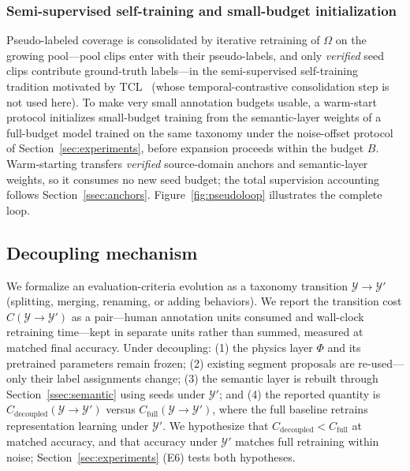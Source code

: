 \subsubsection{Semi-supervised self-training and small-budget initialization}\label{ssec:selftrain}

Pseudo-labeled coverage is consolidated by iterative retraining of $\Omega$ on the growing pool---pool clips enter with their pseudo-labels, and only \emph{verified} seed clips contribute ground-truth labels---in the semi-supervised self-training tradition motivated by TCL~\citep{singh2021tcl} (whose temporal-contrastive consolidation step is not used here). To make very small annotation budgets usable, a warm-start protocol initializes small-budget training from the semantic-layer weights of a full-budget model trained on the same taxonomy under the noise-offset protocol of Section~\ref{sec:experiments}, before expansion proceeds within the budget $B$. Warm-starting transfers \emph{verified} source-domain anchors and semantic-layer weights, so it consumes no new seed budget; the total supervision accounting follows Section~\ref{ssec:anchors}. Figure~\ref{fig:pseudoloop} illustrates the complete loop.

\subsection{Decoupling mechanism}\label{ssec:decoupling}

We formalize an evaluation-criteria evolution as a taxonomy transition $\mathcal{Y} \to \mathcal{Y}'$ (splitting, merging, renaming, or adding behaviors). We report the transition cost $C(\mathcal{Y} \to \mathcal{Y}')$ as a pair---human annotation units consumed and wall-clock retraining time---kept in separate units rather than summed, measured at matched final accuracy. Under decoupling: (1) the physics layer $\Phi$ and its pretrained parameters remain frozen; (2) existing segment proposals are re-used---only their label assignments change; (3) the semantic layer is rebuilt through Section~\ref{ssec:semantic} using seeds under $\mathcal{Y}'$; and (4) the reported quantity is $C_{\mathrm{decoupled}}(\mathcal{Y} \to \mathcal{Y}')$ versus $C_{\mathrm{full}}(\mathcal{Y} \to \mathcal{Y}')$, where the full baseline retrains representation learning under $\mathcal{Y}'$. We hypothesize that $C_{\mathrm{decoupled}} < C_{\mathrm{full}}$ at matched accuracy, and that accuracy under $\mathcal{Y}'$ matches full retraining within noise; Section~\ref{sec:experiments} (E6) tests both hypotheses.
